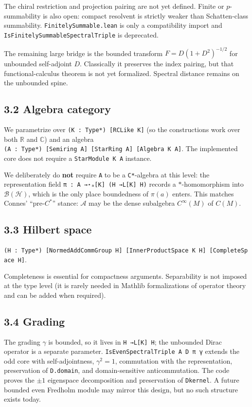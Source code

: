 \documentclass[
  11pt,
]{article}
\begin{document}
The chiral restriction and projection pairing are not yet defined.
Finite or \(p\)-summability is also open: compact resolvent is strictly
weaker than Schatten-class summability. \texttt{FinitelySummable.lean}
is only a compatibility import and
\texttt{IsFinitelySummableSpectralTriple} is deprecated.

The remaining large bridge is the bounded transform
\(F=D(1+D^2)^{-1/2}\) for unbounded self-adjoint \(D\). Classically it
preserves the index pairing, but that functional-calculus theorem is not
yet formalized. Spectral distance remains on the unbounded spine.

\subsection{3.2 Algebra category}\label{algebra-category}

We parametrize over \texttt{(K\ :\ Type*)\ {[}RCLike\ K{]}} (so the
constructions work over both \(\mathbb{R}\) and \(\mathbb{C}\)) and an
algebra
\texttt{(A\ :\ Type*)\ {[}Semiring\ A{]}\ {[}StarRing\ A{]}\ {[}Algebra\ K\ A{]}}.
The implemented core does not require a \texttt{StarModule\ K\ A}
instance.

We deliberately do \textbf{not} require \texttt{A} to be a
\texttt{C*}-algebra at this level: the representation field
\texttt{π\ :\ A\ →⋆ₐ{[}K{]}\ (H\ →L{[}K{]}\ H)} records a
\(*\)-homomorphism into \(\mathcal{B}(\mathcal{H})\), which is the only
place boundedness of \(\pi(a)\) enters. This matches Connes'
``pre-\(C^*\)'' stance: \(\mathcal{A}\) may be the dense subalgebra
\(C^\infty(M)\) of \(C(M)\).

\subsection{3.3 Hilbert space}\label{hilbert-space}

\texttt{(H\ :\ Type*)\ {[}NormedAddCommGroup\ H{]}\ {[}InnerProductSpace\ K\ H{]}\ {[}CompleteSpace\ H{]}}.

Completeness is essential for compactness arguments. Separability is not
imposed at the type level (it is rarely needed in Mathlib formalizations
of operator theory and can be added when required).

\subsection{3.4 Grading}\label{grading}

The grading \(\gamma\) is bounded, so it lives in
\texttt{H\ →L{[}K{]}\ H}; the unbounded Dirac operator is a separate
parameter. \texttt{IsEvenSpectralTriple\ A\ D\ π\ γ} extends the odd
core with self-adjointness, \(\gamma^2=1\), commutation with the
representation, preservation of \texttt{D.domain}, and domain-sensitive
anticommutation. The code proves the \(\pm1\) eigenspace decomposition
and preservation of \texttt{Dkernel}. A future bounded even Fredholm
module may mirror this design, but no such structure exists today.
\end{document}
